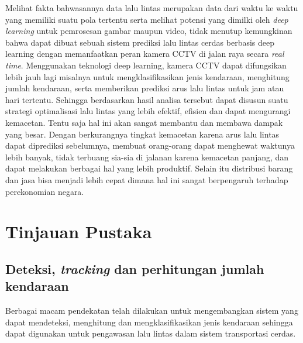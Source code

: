 \documentclass[conference]{IEEEtran}
\begin{document}
Melihat fakta bahwasannya data lalu lintas merupakan data dari waktu ke waktu yang memiliki suatu pola tertentu serta melihat potensi yang dimilki oleh \textit{deep learning} untuk pemrosesan gambar maupun video, tidak menutup kemungkinan bahwa dapat dibuat sebuah sistem prediksi lalu lintas cerdas berbasis deep learning dengan memanfaatkan peran kamera CCTV di jalan raya secara \textit{real time}. 
Menggunakan teknologi deep learning, kamera CCTV dapat difungsikan lebih jauh lagi misalnya untuk mengklasifikasikan jenis kendaraan, menghitung jumlah kendaraan, serta memberikan prediksi arus lalu lintas untuk jam atau hari tertentu. Sehingga berdasarkan hasil analisa tersebut dapat disusun suatu strategi optimalisasi lalu lintas yang lebih efektif, efisien dan dapat mengurangi kemacetan. 
Tentu saja hal ini akan sangat membantu dan membawa dampak yang besar. Dengan berkurangnya tingkat kemacetan karena arus lalu lintas dapat diprediksi sebelumnya, membuat orang-orang dapat menghewat waktunya lebih banyak, tidak terbuang sia-sia di jalanan karena kemacetan panjang, dan dapat melakukan berbagai hal yang lebih produktif. 
Selain itu distribusi barang dan jasa bisa menjadi lebih cepat dimana hal ini sangat berpengaruh terhadap perekonomian negara. 

\section{Tinjauan Pustaka}

\subsection{Deteksi, \textit{tracking} dan perhitungan jumlah kendaraan}

Berbagai macam pendekatan telah dilakukan untuk mengembangkan sistem yang dapat mendeteksi, menghitung dan mengklasifikasikan jenis kendaraan sehingga dapat digunakan untuk pengawasan lalu lintas dalam sistem transportasi cerdas.
\end{document}
